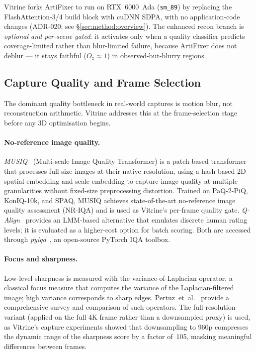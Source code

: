 Vitrine forks ArtiFixer to run on RTX~6000~Ada (\texttt{sm\_89}) by replacing the
FlashAttention-3/4 build block with cuDNN SDPA, with no application-code changes
(ADR-020; see \S\ref{sec:method:overview}).  The enhanced recon branch is
\emph{optional and per-scene gated}: it activates only when a quality classifier
predicts coverage-limited rather than blur-limited failure, because ArtiFixer does
not deblur --- it stays faithful ($O_z \approx 1$) in observed-but-blurry regions.

\subsection{Capture Quality and Frame Selection}
\label{sec:tech:quality}

The dominant quality bottleneck in real-world captures is motion blur, not
reconstruction arithmetic.  Vitrine addresses this at the frame-selection stage
before any 3D optimisation begins.

\paragraph{No-reference image quality.}
\emph{MUSIQ}~\cite{ke2021_musiq} (Multi-scale Image Quality Transformer) is a
patch-based transformer that processes full-size images at their native resolution,
using a hash-based 2D spatial embedding and scale embedding to capture image quality
at multiple granularities without fixed-size preprocessing distortion.  Trained on
PaQ-2-PiQ, KonIQ-10k, and SPAQ, MUSIQ achieves state-of-the-art no-reference image
quality assessment (NR-IQA) and is used as Vitrine's per-frame quality gate.
\emph{Q-Align}~\cite{wang2023_qalign} provides an LMM-based alternative that
emulates discrete human rating levels; it is evaluated as a higher-cost option
for batch scoring.  Both are accessed through \emph{pyiqa}~\cite{chen2022_pyiqa},
an open-source PyTorch IQA toolbox.

\paragraph{Focus and sharpness.}
Low-level sharpness is measured with the variance-of-Laplacian operator, a classical
focus measure that computes the variance of the Laplacian-filtered image; high
variance corresponds to sharp edges.  Pertuz~et~al.\ \cite{pertuz2013_focus}
provide a comprehensive survey and comparison of such operators.  The
full-resolution variant (applied on the full 4K frame rather than a downsampled
proxy) is used, as Vitrine's capture experiments showed that downsampling to 960p
compresses the dynamic range of the sharpness score by a factor of~105, masking
meaningful differences between frames.

